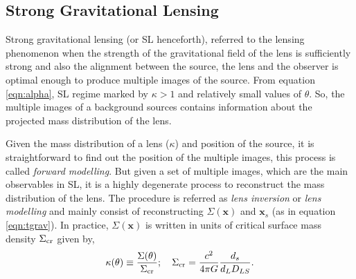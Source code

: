 \subsection{Strong Gravitational Lensing}\label{sec:sl}

Strong gravitational lensing (or SL henceforth), referred to the lensing phenomenon
when the strength of the gravitational field of the lens is sufficiently strong and 
also the alignment between the source, the lens and the observer is optimal enough to
produce multiple images of the source. From equation \ref{eqn:alpha}, SL regime marked
by $\kappa >1$ and relatively small values of $\theta$. So, the multiple images of a
background sources contains information about the projected mass distribution of the lens. 

Given the mass distribution of a lens ($\kappa$) and position of the source,
it is straightforward to find out the position of the multiple images, this process
is called {\it forward modelling}. But given a set of multiple images, which are the main 
observables in SL, it is a highly degenerate process to reconstruct the mass
distribution of the lens. The procedure is referred as {\it lens inversion} or
{\it lens modelling} and mainly consist of reconstructing $\Sigma(\mathbf x)$ and
${\mathbf x}_s$ (as in equation \ref{eqn:tgrav}). In practice, $\Sigma(\mathbf x)$ 
is written in units of critical surface mass density $\Sigma_{\rm cr}$ given by,
\begin{equation}
	\kappa(\theta) \equiv \dfrac{\Sigma(\theta)}{\Sigma_{\rm cr}}; \quad
	\Sigma_{\rm cr} = \dfrac{c^2}{4\pi G} \dfrac{d_s}{d_L D_{LS}}.
\end{equation}



